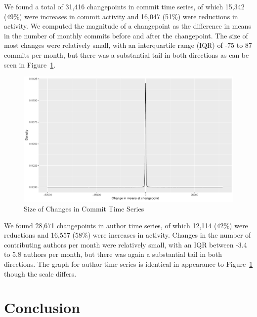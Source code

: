 \documentclass[10pt,conference]{IEEEtran}
\begin{document}
We found a total of 31,416 changepoints in commit time series, of which 15,342 (49\%) were increases in commit activity and 16,047 (51\%) were reductions in activity. We computed the magnitude of a changepoint as the difference in means in the number of monthly commits before and after the changepoint. The size of most changes were relatively small, with an interquartile range (IQR) of -75 to 87 commits per month, but there was a substantial tail in both directions as can be seen in Figure~\ref{fig:commitsizes}.
\begin{figure}[ht!]
    \centering
    \includegraphics[width=\linewidth]{commit-changesizes.pdf}
    \caption{Size of Changes in Commit Time Series}
    \label{fig:commitsizes}
\end{figure}

We found 28,671 changepoints in author time series, of which 12,114 (42\%) were reductions and 16,557 (58\%) were increases in activity. Changes in the number of contributing authors per month were relatively small, with an IQR between -3.4 to 5.8 authors per month, but there was again a substantial tail in both directions. The graph for author time series is identical in appearance to Figure~\ref{fig:commitsizes} though the scale differs.

\section{Conclusion}
\end{document}
